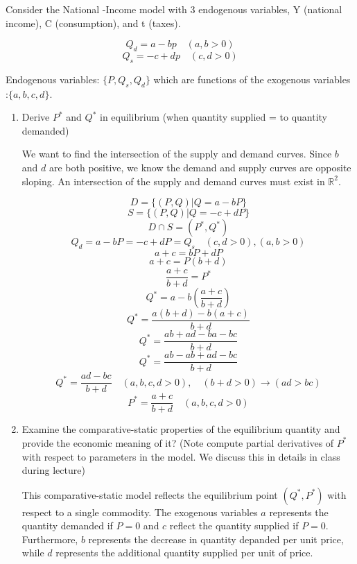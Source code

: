 \documentclass[12pt]{article}
\newcounter{ques}
\newenvironment{question}{\stepcounter{ques}{\noindent\bf Question \arabic{ques}:}}{\vspace{5mm}}
\begin{document}
\begin{question}
      Consider the National -Income model with 3 endogenous variables, Y (national income), C (consumption), and t (taxes).

      $$Q_d = a-bp \quad (a, b> 0)$$
      $$Q_s = -c +dp \quad (c, d > 0)$$

      Endogenous variables:  $\{P, Q_s, Q_d\}$ which are functions of the exogenous variables :$\{a,b,c,d\}$.
     


      \begin{enumerate}[label=(\alph*)]
            \item Derive $P^*$ and $Q^*$ in equilibrium (when quantity supplied = to quantity demanded)
      
            We want to find the intersection of the supply and demand curves. Since $b$ and $d$ are both positive, we know the demand 
            and supply curves are opposite sloping. An intersection of the supply and demand curves must exist in $\mathbb{R}^2$.

            $$D = \{(P,Q) | Q = a-bP\} $$
            $$S = \{(P,Q) | Q = -c +dP\} $$
            $$D \cap S = (P^*, Q^*)$$
            $$  Q_d = a-bP = -c +dP = Q_s \quad (c, d > 0), (a, b > 0)$$
            $$   a + c = bP +dP  $$
            $$   a + c = P(b +d)  $$
            $$   \frac{a + c}{b +d} = P^* $$
            $$ Q^* = a-b\left(\frac{a + c}{b +d}\right) $$
            $$ Q^* = \frac{a(b + d) - b(a + c)}{b +d} $$
            $$ Q^* = \frac{ab +ad - ba - bc}{b +d} $$
            $$ Q^* = \frac{ab - ab +ad - bc}{b +d} $$
            $$ Q^* = \frac{ad - bc}{b +d} \quad (a, b, c, d > 0),\quad (b+d > 0) \rightarrow (ad > bc)$$
            $$  P^* = \frac{a + c}{b +d}  \quad (a, b, c, d > 0)$$

            \item Examine the comparative-static properties of the equilibrium quantity and provide the economic meaning
            of it? (Note compute partial derivatives 
            of $P^*$ with respect to parameters in the model. We discuss this in details in class during lecture)

            This comparative-static model reflects the equilibrium point $(Q^*, P^*)$ with respect to a single commodity.
            The exogenous variables $a$ represents the quantity demanded if $P = 0$ and $c$ reflect the quantity supplied if $P=0$.
            Furthermore, $b$ represents the decrease in quantity depanded per unit price, while $d$ represents the additional quantity supplied per unit of price.
            

\end{enumerate}
\end{question}
\end{document}
